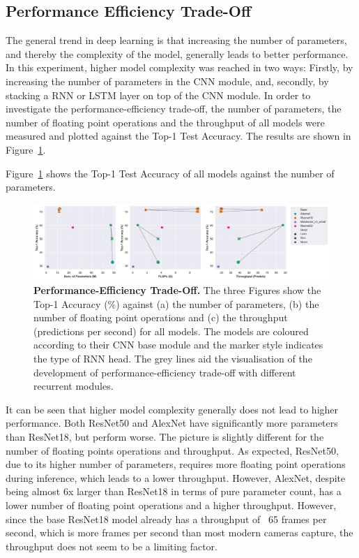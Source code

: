 \documentclass[a4paper]{article}
\begin{document}
  \subsection{Performance Efficiency Trade-Off} %
  \label{sub:Performance Efficiency Trade-Off}

  The general trend in deep learning is that increasing the number of
  parameters, and thereby the complexity of the model, generally leads to better 
  performance. In this experiment, higher model complexity was reached in two
  ways: Firstly, by increasing the number of parameters in the CNN module, and,
  secondly, by stacking a RNN or LSTM layer on top of the CNN module.
  In order to investigate the performance-efficiency trade-off, the number of
  parameters, the number of floating point operations and the throughput of all
  models were measured and plotted against the Top-1 Test Accuracy. The results
  are shown in Figure~\ref{fig:performance-efficiency-trade-off}.

  Figure~\ref{fig:performance-efficiency-trade-off} shows the Top-1 Test
  Accuracy of all models against the number of parameters.
  
  \begin{figure}[ht]
    \centering
    \includegraphics[width=\textwidth]{./figures/experiment1-scatter-plots.png}

    \caption{
      \textbf{Performance-Efficiency Trade-Off.} The three Figures show the
      Top-1 Accuracy (\%) against (a) the number of parameters, (b) the number
      of floating point operations and (c) the throughput (predictions per
      second) for all models. The models are coloured according to their
      CNN base module and the marker style indicates the type of RNN head.
      The grey lines aid the visualisation of the development of
      performance-efficiency trade-off with different recurrent modules.
    }

    \label{fig:performance-efficiency-trade-off}
  \end{figure}

  It can be seen that higher model complexity generally does not lead to higher
  performance. Both ResNet50 and AlexNet have significantly more parameters than
  ResNet18, but perform worse. The picture is slightly different for the number
  of floating points operations and throughput. As expected, ResNet50, due to
  its higher number of parameters, requires more floating point operations
  during inference, which leads to a lower throughput. However, AlexNet, despite
  being almost 6x larger than ResNet18 in terms of pure parameter count, has a
  lower number of floating point operations and a higher throughput. However,
  since the base ResNet18 model already has a throughput of ~65 frames per
  second, which is more frames per second than most modern cameras capture, the
  throughput does not seem to be a limiting factor.
\end{document}
